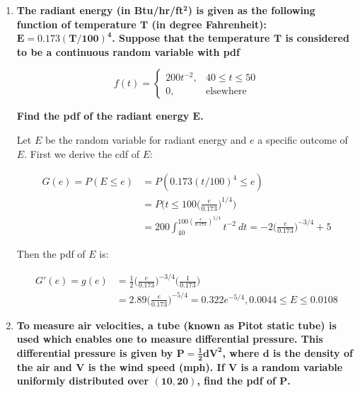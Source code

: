 \documentclass[10pt, oneside]{article}
\begin{document}
\begin{enumerate}[label=5.\arabic*]
\begin{enumerate}
	Therefore, the probability distribution function here is:
	
	\[ g(y) = \begin{dcases} a/k, & y = 0 \\
	\frac{x_0 - a}{ky_0}, & 0 < y < y_0 \\
	1 - \frac{x_0}{k}, & y = y_0
	\end{dcases}
	\]
	\end{enumerate}

\item  \begin{tcolorbox}[
  colback=Cerulean!5!white,
  colframe=Cerulean!75!black]
\textbf{The radiant energy (in Btu/hr/ft$\bm{^2}$) is given as the following function of temperature $\bm{T}$ (in degree Fahrenheit): $\bm{E = 0.173 (T / 100)^4}$. Suppose that the temperature $\bm{T}$ is considered to be a continuous random variable with pdf}

\[ f(t) = \begin{cases}  200t^{-2}, & 40 \leq t \leq 50 \\
0, & \text{elsewhere} 
\end{cases} \]

\textbf{Find the pdf of the radiant energy $\bm{E}$.}
\end{tcolorbox}

Let $E$ be the random variable for radiant energy and $e$ a specific outcome of $E$. First we derive the cdf of $E$:

\begin{align*}
G(e) = P(E \leq e) &= P(0.173 (t / 100)^4 \leq e) \\
&= P \Big( t \leq 100 \Big( \frac{e}{0.173} \Big)^{1/4} \Big) \\
&= 200 \int^{100 (\frac{e}{0.173})^{1/4}}_{40} t^{-2} \ dt = - 2 \Big( \frac{e}{0.173} \Big)^{-3/4} + 5
\end{align*}

Then the pdf of $E$ is:

\begin{align*}
G'(e) = g(e) &= \frac{1}{2} \Big( \frac{e}{0.173} \Big)^{-3/4} \Big( \frac{1}{0.173} \Big) \\
&= 2.89 \Big( \frac{e}{0.173} \Big)^{-5/4} = \boxed{0.322 e^{-5/4}, 0.0044 \leq E \leq 0.0108}
\end{align*}

\item  \begin{tcolorbox}[
  colback=Cerulean!5!white,
  colframe=Cerulean!75!black]
\textbf{To measure air velocities, a tube (known as Pitot static tube) is used which enables one to measure differential pressure. This differential pressure is given by $\bm{P = \frac{1}{2} dV^2}$, where $\bm{d}$ is the density of the air and $\bm{V}$ is the wind speed (mph). If $\bm{V}$ is a random variable uniformly distributed over $\bm{(10,20)}$, find the pdf of $\bm{P}$.}
\end{tcolorbox}


\end{enumerate}
\end{document}

